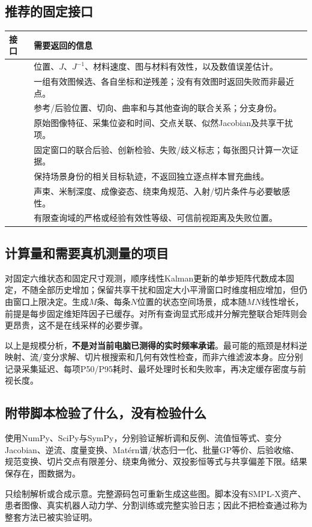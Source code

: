\documentclass[UTF8,11pt,a4paper,fontset=fandol]{ctexart}
\numberwithin{equation}{section}
\theoremstyle{plain}
\theoremstyle{definition}
\theoremstyle{remark}
\begin{document}
\subsection{推荐的固定接口}
\begin{table}[H]
\centering\small
\begin{tabularx}{\textwidth}{P{37mm}Y}
\toprule 接口 & 需要返回的信息\\\midrule
{} & 位置、$J$、$J^{-1}$、材料速度、图与材料有效性，以及数值误差估计。\\
 & 一组有效图候选、各自坐标和逆残差；没有有效图时返回失败而非最近点。\\
 & 参考/后验位置、切向、曲率和与其他查询的联合关系；分支身份。\\
 & 原始图像特征、采集位姿和时间、交点关联、似然Jacobian及共享干扰项。\\
 & 固定窗口的联合后验、创新检验、失败/歧义标志；每张图只计算一次证据。\\
 & 保持场景身份的相关目标轨迹，不返回独立逐点样本冒充曲线。\\
 & 声束、米制深度、成像姿态、绕束角规范、入射/切片条件与必要敏感性。\\
 & 有限查询域的严格或经验有效性等级、可信前视距离及失败位置。\\
\bottomrule
\end{tabularx}
\end{table}

\subsection{计算量和需要真机测量的项目}
对固定六维状态和固定尺寸观测，顺序线性Kalman更新的单步矩阵代数成本固定，不随全部历史增加；保留共享干扰和固定大小平滑窗口时维度相应增加，但仍由窗口上限决定。生成$M$条、每条$N$位置的状态空间场景，成本随$MN$线性增长，前提是每步固定维矩阵因子已缓存。对所有查询显式形成并分解完整联合矩阵则会更昂贵，这不是在线采样的必要步骤。

以上是规模分析，\textbf{不是对当前电脑已测得的实时频率承诺}。最可能的瓶颈是材料逆映射、流/变分求解、切片根搜索和几何有效性检查，而非六维滤波本身。应分别记录采集延迟、每项P50/P95耗时、最坏处理时长和失败率，再决定缓存密度与前视长度。

\subsection{附带脚本检验了什么，没有检验什么}
使用NumPy、SciPy与SymPy，分别验证解析调和反例、流值恒等式、变分Jacobian、逆流、度量变换、Mat\'ern谱/状态归一化、批量GP等价、后验收缩、规范变换、切片交点有限差分、绕束角微分、双投影恒等式与共享偏差下限。结果保存在，图数据为。

只绘制解析或合成示意。完整源码包可重新生成这些图。脚本没有SMPL-X资产、患者图像、真实机器人动力学、分割训练或完整实验日志；因此不把检查通过称为整套方法已被实验证明。

\clearpage


\end{document}

